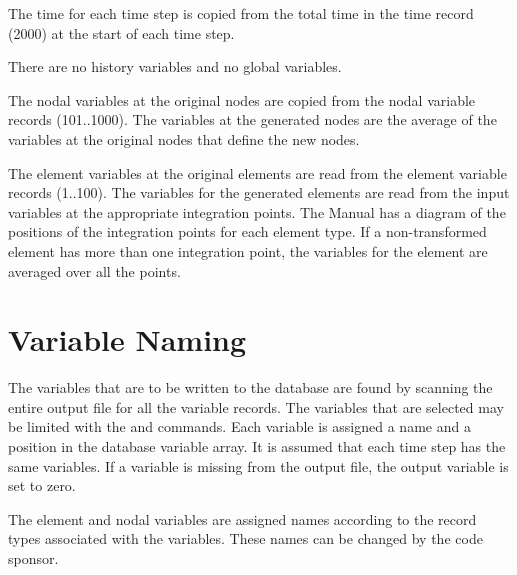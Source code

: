 The time for each time step is copied from the total time in the
 time record (2000) at the start of each time step.


There are no history variables and no global variables.

The nodal variables at the original nodes are copied from the
 nodal variable records (101..1000). The variables at the
generated nodes are the average of the variables at the original nodes
that define the new nodes.

The element variables at the original elements are read from the
 element variable records (1..100). The variables for the
generated elements are read from the input variables at the appropriate
integration points. The  Manual has a diagram of the
positions of the integration points for each element type. If a
non-transformed element has more than one integration point, the
variables for the element are averaged over all the points.

\section{Variable Naming} \label{trans:varnam}

The variables that are to be written to the  database are
found by scanning the entire  output file for all the variable
records. The variables that are selected may be limited with the
 and  commands. Each variable is assigned a name
and a position in the  database variable array. It is
assumed that each time step has the same variables. If a variable is
missing from the  output file, the output variable is set to
zero.

The element and nodal variables are assigned names according to the
record types associated with the variables. These names can be changed
by the code sponsor.


